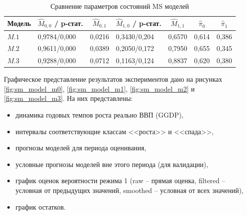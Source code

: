 \documentclass[a4paper,14pt]{extreport}
\begin{document}
\begin{table}[H]
	\begin{tabular}{l|ll|ll|ll}
		\hline
		\multicolumn{1}{c|}{\textbf{Модель}} & \multicolumn{1}{c}{$\hat{M}_{0,0}$ / p-стат.} & \multicolumn{1}{c|}{$\hat{M}_{0,1}$} & \multicolumn{1}{c}{$\hat{M}_{1,0}$ / p-стат.} & \multicolumn{1}{c|}{$\hat{M}_{1,1}$} & \multicolumn{1}{c}{$\hat{\pi}_0$} & \multicolumn{1}{c}{$\hat{\pi}_1$} \\ \hline
		$M.1$                                & 0,9784/0,000                                  & 0,0216                               & 0,3430/0,204                                  & 0,6570                               & 0,614                             & 0,386                             \\
		$M.2$                                & 0,9611/0,000                                  & 0,0389                               & 0,2050/0,172                                  & 0,7950                               & 0,655                             & 0,345                             \\
		$M.3$                                & 0,9288/0,000                                  & 0,0712                               & 0,1163/0,124                                  & 0,8837                               & 0,620                             & 0,380                             \\ \hline
	\end{tabular}
	\caption{Сравнение параметров состояний MS моделей}
	\label{tbl:ggdp_model_params_ms}
\end{table}


Графическое представление результатов экспериментов дано на рисунках \ref{fig:sm_model_m0}, \ref{fig:sm_model_m1}, \ref{fig:sm_model_m2} и \ref{fig:sm_model_m3}. На них представлены:
\begin{itemize}
	\item динамика годовых темпов роста реально ВВП (GGDP),
	\item интервалы соответствующие классам <<роста>> и <<спада>>,
	\item прогнозы моделей для периода оценивания,
	\item условные прогнозы моделей вне этого периода (для валидации),
	\item график оценок вероятности режима 1 (raw -- прямая оценка, filtered -- условная от предыдущих значений, smoothed -- условная от всех значений),
	\item график остатков.
\end{itemize}
\end{document}
